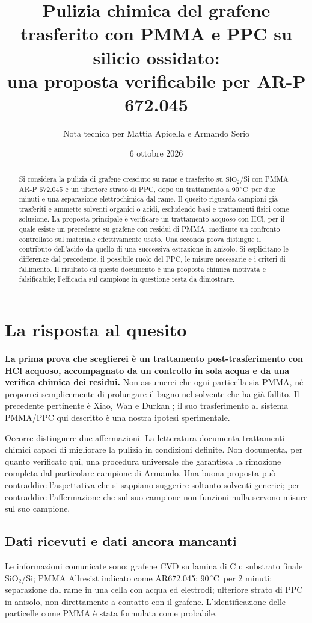 \documentclass[11pt,reqno]{amsart}
\title[Pulizia chimica del grafene PMMA/PPC]{Pulizia chimica del grafene trasferito con PMMA e PPC su silicio ossidato:\\ una proposta verificabile per AR-P 672.045}
\author{Nota tecnica per Mattia Apicella e Armando Serio}
\date{6 ottobre 2026}
\numberwithin{equation}{section}
\newcommand{\SiO}{\ensuremath{\mathrm{SiO}_2}}
\newcommand{\degC}{\ensuremath{^{\circ}\mathrm{C}}}
\begin{document}
\begin{abstract}
Si considera la pulizia di grafene cresciuto su rame e trasferito su
\SiO/Si con PMMA AR-P 672.045 e un ulteriore strato di PPC, dopo
un trattamento a 90\,\degC\ per due minuti e una separazione
elettrochimica dal rame. Il quesito riguarda campioni gi\`a trasferiti
e ammette solventi organici o acidi, escludendo basi e trattamenti fisici
come soluzione. La proposta principale \`e verificare un trattamento
acquoso con HCl, per il quale esiste un precedente su grafene con
residui di PMMA, mediante un confronto controllato sul materiale
effettivamente usato. Una seconda prova distingue il contributo
dell'acido da quello di una successiva estrazione in anisolo.
Si esplicitano le differenze dal precedente, il possibile ruolo del PPC,
le misure necessarie e i criteri di fallimento. Il risultato di questo
documento \`e una proposta chimica motivata e falsificabile; l'efficacia
sul campione in questione resta da dimostrare.
\end{abstract}
\maketitle

\section{La risposta al quesito}

\textbf{La prima prova che sceglierei \`e un trattamento post-trasferimento
con HCl acquoso, accompagnato da un controllo in sola acqua e da una
verifica chimica dei residui.} Non assumerei che ogni particella sia PMMA,
n\'e proporrei semplicemente di prolungare il bagno nel solvente che ha
gi\`a fallito. Il precedente pertinente \`e Xiao, Wan e Durkan
\cite{Xiao2019}; il suo trasferimento al sistema PMMA/PPC qui descritto
\`e una nostra ipotesi sperimentale.

Occorre distinguere due affermazioni. La letteratura documenta trattamenti
chimici capaci di migliorare la pulizia in condizioni definite. Non
documenta, per quanto verificato qui, una procedura universale che
garantisca la rimozione completa dal particolare campione di Armando.
Una buona proposta pu\`o contraddire l'aspettativa che si sappiano suggerire
soltanto solventi generici; per contraddire l'affermazione che sul suo
campione non funzioni nulla servono misure sul suo campione.

\subsection{Dati ricevuti e dati ancora mancanti}
Le informazioni comunicate sono: grafene CVD su lamina di Cu;
substrato finale \SiO/Si; PMMA Allresist indicato come AR672.045;
90\,\degC\ per 2 minuti; separazione dal rame in una cella con acqua
ed elettrodi; ulteriore strato di PPC in anisolo, non direttamente a
contatto con il grafene. L'identificazione delle particelle come PMMA
\`e stata formulata come probabile.
\end{document}
